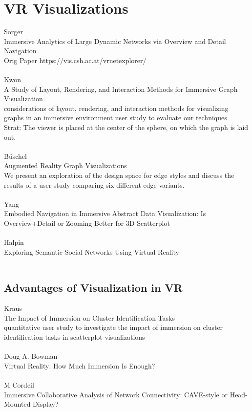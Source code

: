 \section{VR Visualizations}

Sorger\\
Immersive Analytics of Large Dynamic Networks via Overview and Detail Navigation\\
Orig Paper https://vis.csh.ac.at/vrnetexplorer/\\
\\
Kwon\\
A Study of Layout, Rendering, and Interaction Methods for Immersive Graph Visualization\\
considerations of layout, rendering, and interaction methods for visualizing graphs in an  immersive environment user study to evaluate our techniques\\
Strat: The viewer is placed at the center of the sphere, on which the graph is laid out.\\
\\
Büschel\\
Augmented Reality Graph Visualizations\\
We present an exploration of the design space for edge styles and discuss the results of a user study comparing six different edge variants.\\
\\
Yang\\
Embodied Navigation in Immersive Abstract Data Visualization:
Is Overview+Detail or Zooming Better for 3D Scatterplot\\
\\
Halpin\\
Exploring Semantic Social Networks Using Virtual Reality\\
\\

\subsection{Advantages of Visualization in VR}
Kraus\\
The Impact of Immersion on Cluster Identification Tasks\\
quantitative user study to investigate the impact of immersion on cluster identification tasks in scatterplot visualizations\\
\\
Doug A. Bowman\\
Virtual Reality: How Much Immersion Is Enough?\\
\\
M Cordeil\\
Immersive Collaborative Analysis of Network Connectivity: CAVE-style or Head-Mounted Display?\\
\\

